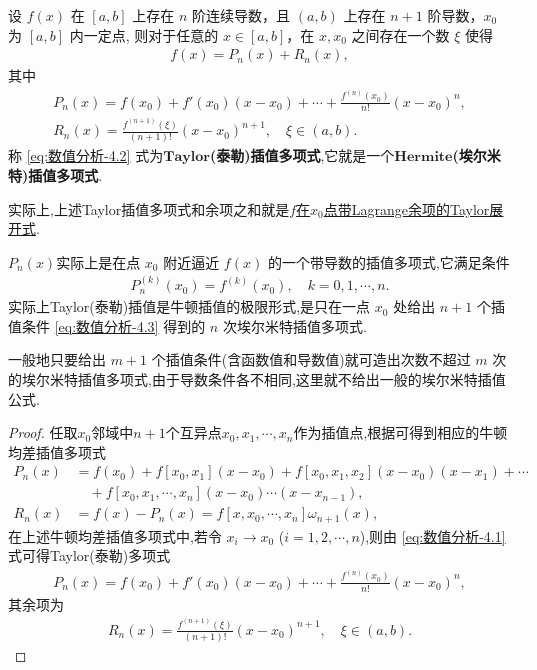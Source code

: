 \documentclass[../../main.tex]{subfiles}%
\begin{document}
\begin{theorem}
设 $f(x)$ 在 $[a, b]$ 上存在 $n$ 阶连续导数，且 $(a, b)$ 上存在 $n + 1$ 阶导数，$x_0$ 为 $[a, b]$ 内一定点,
则对于任意的 $x \in [a, b]$，在 $x, x_0$ 之间存在一个数 $\xi$ 使得
\begin{align*}
f(x) = P_n(x)+R_n(x),
\end{align*}
其中
\begin{gather}
P_n(x) = f(x_0) + f'(x_0)(x - x_0) + \cdots + \frac{f^{(n)}(x_0)}{n!}(x - x_0)^n,\label{eq:数值分析-4.2}
\\
R_n(x) = \frac{f^{(n+1)}(\xi)}{(n+1)!}(x - x_0)^{n+1}, \quad \xi \in (a, b).\label{eq:数值分析-4.4}
\end{gather}
称 \eqref{eq:数值分析-4.2} 式为$\mathbf{Taylor}$\textbf{(泰勒)插值多项式},它就是一个$\mathbf{Hermite}$\textbf{(埃尔米特)插值多项式}.
\end{theorem}
\begin{remark}
实际上,上述Taylor插值多项式和余项之和就是\hyperref[Basis-of-Analytics-theorem:带各种余项的Taylor公式]{$f$在$x_0$点带Lagrange余项的Taylor展开式}.
\end{remark}
\begin{remark}
$P_n(x)$实际上是在点 $x_0$ 附近逼近 $f(x)$ 的一个带导数的插值多项式,它满足条件
\begin{align}
P_n^{(k)}(x_0) = f^{(k)}(x_0), \quad k = 0, 1, \cdots, n. \label{eq:数值分析-4.3}
\end{align}
实际上Taylor(泰勒)插值是牛顿插值的极限形式,是只在一点 $x_0$ 处给出 $n + 1$ 个插值条件 \eqref{eq:数值分析-4.3} 得到的 $n$ 次埃尔米特插值多项式.

一般地只要给出 $m + 1$ 个插值条件(含函数值和导数值)就可造出次数不超过 $m$ 次的埃尔米特插值多项式,由于导数条件各不相同,这里就不给出一般的埃尔米特插值公式.
\end{remark}
\begin{proof}

任取$x_0$邻域中$n+1$个互异点$x_0,x_1,\cdots,x_n$作为插值点,根据可得到相应的牛顿均差插值多项式
\begin{align*}
P_n(x) &= f(x_0) + f[x_0, x_1](x - x_0) + f[x_0, x_1, x_2](x - x_0)(x - x_1) + \cdots  \\
&\quad + f[x_0, x_1, \cdots, x_n](x - x_0) \cdots (x - x_{n-1}),\\
R_n(x) &= f(x) - P_n(x) = f[x, x_0, \cdots, x_n]\omega_{n+1}(x),
\end{align*}
在上述牛顿均差插值多项式中,若令 $x_i \to x_0$ ($i = 1, 2, \cdots, n$),则由 \eqref{eq:数值分析-4.1} 式可得Taylor(泰勒)多项式
\begin{align*}
P_n(x) = f(x_0) + f'(x_0)(x - x_0) + \cdots + \frac{f^{(n)}(x_0)}{n!}(x - x_0)^n, 
\end{align*}
其余项为
\begin{align*}
R_n(x) = \frac{f^{(n+1)}(\xi)}{(n+1)!}(x - x_0)^{n+1}, \quad \xi \in (a, b). 
\end{align*}

\end{proof}
\end{document}
